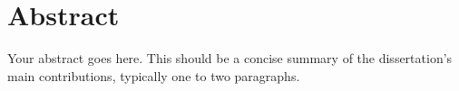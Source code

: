
\section*{Abstract}

Your abstract goes here.  This should be a concise summary of the
dissertation's main contributions, typically one to two paragraphs.
